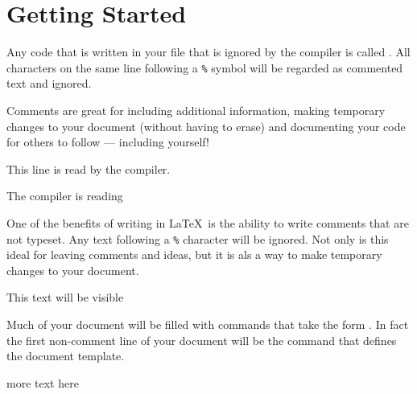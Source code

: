 \section{Getting Started}
\begin{definition}
  Any code that is written in your file that is ignored by the compiler is
  called .  All characters on the same line following
  a \verb!%! symbol will be regarded as commented text and ignored.
\end{definition}

Comments are great for including additional information, making temporary 
changes to your document (without having to erase) and documenting your
code for others to follow --- including yourself!

\begin{dispExample}
This line is read by the compiler.

The compiler is reading %
\end{dispExample}
One of the benefits of writing in \LaTeX\, is the ability to write comments
that are not typeset.  Any text following a \verb!%! character will be 
ignored.  Not only is this ideal for leaving comments and ideas, but it is 
als a way to make temporary changes to your document.



\begin{mhotexbox}
This text will be visible %
\end{mhotexbox}
Much of your document will be filled with commands that take the form 
. In fact the first non-comment line of your document will be the command 
that defines the document template.
more text here
